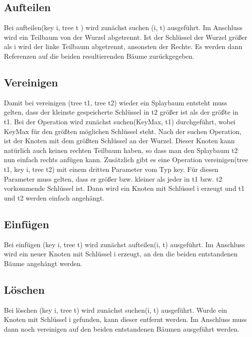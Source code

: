 \documentclass[11pt, a4paper]{article}
\begin{document}
	\subsection{Aufteilen}
	Bei aufteilen(key i, tree t ) wird zunächst suchen (i, t) ausgeführt. Im Anschluss wird ein Teilbaum von der Wurzel abgetrennt. Ist der Schlüssel der Wurzel größer als i wird der linke Teilbaum abgetrennt, ansonsten der Rechte. Es werden dann Referenzen auf die beiden resultierenden Bäume zurückgegeben.

	\subsection{Vereinigen} 
	Damit bei vereinigen (tree t1, tree t2) wieder ein Splaybaum entsteht muss gelten, dass der kleinste gespeicherte Schlüssel in t2 größer ist als der größte in t1. Bei der Operation wird zunächst suchen(KeyMax, t1) durchgeführt, wobei KeyMax für den größten möglichen Schlüssel steht. Nach der suchen Operation, ist der Knoten mit dem größten Schlüssel an der Wurzel. Dieser Knoten kann natürlich auch keinen rechten Teilbaum haben, so dass man den Splaybaum t2 nun einfach rechts anfügen kann. Zusätzlich gibt es eine Operation vereinigen(tree t1, key i, tree t2) mit einem dritten Parameter vom Typ key. Für diesen Parameter muss gelten, dass er größer bzw. kleiner als jeder in t1 bzw. t2 vorkommende Schlüssel ist. Dann wird ein Knoten mit Schlüssel i erzeugt und t1 und t2 werden einfach angehängt.

	\subsection{Einfügen}
	Bei einfügen (key i, tree t) wird zunächst aufteilen(i, t) ausgeführt. Im Anschluss wird ein neuer Knoten mit Schlüssel i erzeugt, an den die beiden entstandenen Bäume angehängt werden.


	\subsection{Löschen}
	Bei löschen (key i, tree t) wird zunächst suchen(i, t) ausgeführt. Wurde ein Knoten mit Schlüssel i gefunden, kann dieser entfernt werden. Im Anschluss muss dann noch vereinigen auf den beiden entstandenen Bäumen ausgeführt werden.   

	

	
 
\end{document}
